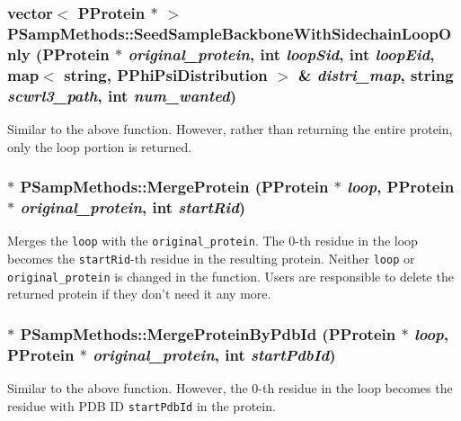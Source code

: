 \subsubsection{\setlength{\rightskip}{0pt plus 5cm}vector$<$ {\bf PProtein} $\ast$ $>$ PSamp\-Methods::Seed\-Sample\-Backbone\-With\-Sidechain\-Loop\-Only ({\bf PProtein} $\ast$ {\em original\_\-protein}, int {\em loop\-Sid}, int {\em loop\-Eid}, map$<$ string, {\bf PPhi\-Psi\-Distribution} $>$ \& {\em distri\_\-map}, string {\em scwrl3\_\-path}, int {\em num\_\-wanted})\hspace{0.3cm}{\tt  [static]}}\label{classPSampMethods_30e5c430ba0ef875203858f9e84d0c2f}


Similar to the above function. However, rather than returning the entire protein, only the loop portion is returned. 
\subsubsection{ $\ast$ PSamp\-Methods::Merge\-Protein ({\bf PProtein} $\ast$ {\em loop}, {\bf PProtein} $\ast$ {\em original\_\-protein}, int {\em start\-Rid})\hspace{0.3cm}{\tt  [static]}}\label{classPSampMethods_6b9fea52c286774ccf5986db95890c63}


Merges the {\tt loop} with the {\tt original\_\-protein}. The 0-th residue in the loop becomes the {\tt start\-Rid}-th residue in the resulting protein. Neither {\tt loop} or {\tt original\_\-protein} is changed in the function. Users are responsible to delete the returned protein if they don't need it any more. 
\subsubsection{ $\ast$ PSamp\-Methods::Merge\-Protein\-By\-Pdb\-Id ({\bf PProtein} $\ast$ {\em loop}, {\bf PProtein} $\ast$ {\em original\_\-protein}, int {\em start\-Pdb\-Id})\hspace{0.3cm}{\tt  [static]}}\label{classPSampMethods_c335c3953f0823baa5e6db49348cef5a}


Similar to the above function. However, the 0-th residue in the loop becomes the residue with PDB ID {\tt start\-Pdb\-Id} in the protein. 
